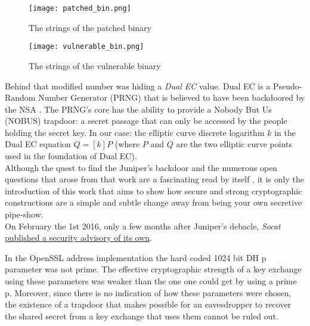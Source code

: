 \documentclass[a4paper,11pt,twocolumn]{article}
\begin{document}
\begin{figure}[H]
\centering
\texttt{[image: patched\_bin.png]}
\caption{The strings of the patched binary}\label{screenOS}
\end{figure}

\begin{figure}[H]
\centering
\texttt{[image: vulnerable\_bin.png]}
\caption{The strings of the vulnerable binary}\label{screenOS}
\end{figure}

Behind that modified number was hiding a \emph{Dual EC} value. Dual EC is a Pseudo-Random Number Generator (PRNG) that is believed to have been backdoored by the NSA \cite{dualEC}. The PRNG's core has the ability to provide a Nobody But Us (NOBUS) trapdoor: a secret passage that can only be accessed by the people holding the secret key. In our case: the elliptic curve discrete logarithm $k$ in the Dual EC equation $Q = [k]P$ (where $P$ and $Q$ are the two elliptic curve points used in the foundation of Dual EC).\\

Although the quest to find the Juniper's backdoor and the numerous open questions that arose from that work are a fascinating read by itself \cite{juniper}, it is only the introduction of this work that aims to show how secure and strong cryptographic constructions are a simple and subtle change away from being your own secretive pipe-show.\\

On February the 1st 2016, only a few months after Juniper's debacle, \emph{Socat} \href{http://www.openwall.com/lists/oss-security/2016/02/01/4}{published a security advisory of its own}.

\begin{displayquote}
In the OpenSSL address implementation the hard coded 1024 bit DH p parameter was not prime. The effective cryptographic strength of a key exchange using these parameters was weaker than the one one could get by using a prime p. Moreover, since there is no indication of how these parameters were chosen, the existence of a trapdoor that makes possible for an eavesdropper to recover the shared secret from a key exchange that uses them cannot be ruled out.
\end{displayquote}
\end{document}
